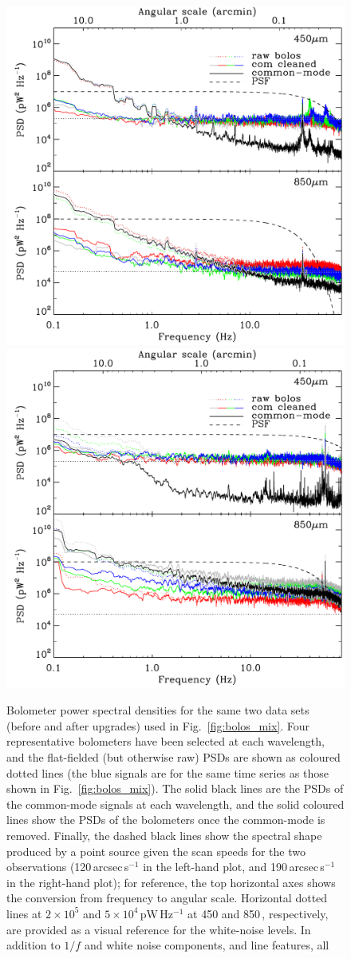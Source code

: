 \documentclass[useAMS,usenatbib,nofootinbib]{mn2e}
\begin{document}
\begin{figure}
\centering
\includegraphics[width=0.49\linewidth]{pspec_s2sro.pdf}
\includegraphics[width=0.49\linewidth]{pspec.pdf}
\caption{Bolometer power spectral densities for the same two data sets
  (before and after upgrades) used in Fig.~\ref{fig:bolos_mix}. Four
  representative bolometers have been selected at each wavelength, and
  the flat-fielded (but otherwise raw) PSDs are shown as coloured
  dotted lines (the blue signals are for the same time series as those
  shown in Fig.~\ref{fig:bolos_mix}).  The solid black lines are the
  PSDs of the common-mode signals at each wavelength, and the solid
  coloured lines show the PSDs of the bolometers once the common-mode
  is removed.  Finally, the dashed black lines show the spectral shape
  produced by a point source given the scan speeds for the two
  observations (120\,arcsec\,s$^{-1}$ in the left-hand plot, and
  190\,arcsec\,s$^{-1}$ in the right-hand plot); for reference, the
  top horizontal axes shows the conversion from frequency to angular
  scale. Horizontal dotted lines at $2 \times 10^5$ and $5 \times
  10^4$\,pW\,Hz$^{-1}$ at 450 and 850\,\micron, respectively, are
  provided as a visual reference for the white-noise levels. In
  addition to $1/f$ and white noise components, and line features, all
}
\end{figure}
\end{document}

